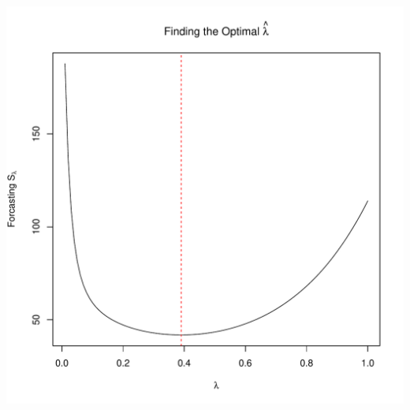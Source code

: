 \documentclass[ xcolor = pdftex, dvipsnames, table ]{beamer}
\begin{document}
\begin{frame}{}%
\begin{center}
\includegraphics[height=\textheight]{ssRastHardOpt.pdf}
\end{center}
\end{frame}
\end{document}
